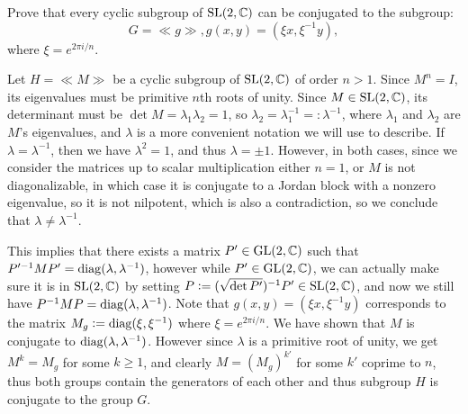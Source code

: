 \documentclass[11pt, a4paper]{article}
\begin{document}
\begin{exercise}
  \label{ex:subgroups-of-sl}
  Prove that every cyclic subgroup of $\mathrm{SL}(2,\mathbb{C})$
  can be conjugated to the subgroup:
  \[
    G = \ll g \gg,
    g(x,y) = (\xi x, \xi^{-1} y),
  \]
  where $\xi = e^{2\pi i/n}$.
\end{exercise}
\begin{solution}
  Let $H = \ll M \gg$ be a cyclic subgroup of $\mathrm{SL}(2,\mathbb{C})$ of order $n > 1$.
  Since $M^n = I$, its eigenvalues must be primitive $n$th roots of unity.
  Since $M \in \mathrm{SL}(2,\mathbb{C})$, its determinant must be
  $\det M = \lambda_1 \lambda_2 = 1$,
  so $\lambda_2 = \lambda_1^{-1} =: \lambda^{-1}$,
  where $\lambda_1$ and $\lambda_2$ are $M$'s eigenvalues,
  and $\lambda$ is a more convenient notation we will use to describe.
  If $\lambda = \lambda^{-1}$, then we have $\lambda^2 = 1$,
  and thus $\lambda = \pm 1$.
  However, in both cases, since we consider the matrices up to scalar
  multiplication either $n = 1$, or $M$ is not diagonalizable,
  in which case it is conjugate to a Jordan block with a nonzero
  eigenvalue, so it is not nilpotent, which is also a contradiction,
  so we conclude that $\lambda \neq \lambda^{-1}$.

  This implies that there exists a matrix $P' \in \mathrm{GL}(2,\mathbb{C})$
  such that $P'^{-1} M P' = \operatorname{diag}(\lambda,\lambda^{-1})$,
  however while $P' \in \mathrm{GL}(2,\mathbb{C})$,
  we can actually make sure it is in $\mathrm{SL}(2,\mathbb{C})$
  by setting $P := (\sqrt{\det P'})^{-1} P' \in \mathrm{SL}(2,\mathbb{C})$,
  and now we still have $P^{-1} M P = \operatorname{diag}(\lambda,\lambda^{-1})$.
  Note that $g(x,y) = (\xi x, \xi^{-1} y)$ corresponds
  to the matrix $M_g := \operatorname{diag}(\xi,\xi^{-1})$ where $\xi = e^{2\pi i/n}$.
  We have shown that $M$ is conjugate to $\operatorname{diag}(\lambda,\lambda^{-1})$.
  However since $\lambda$ is a primitive root of unity,
  we get $M^k = M_g$ for some $k \geq 1$,
  and clearly $M = (M_g)^{k'}$ for some $k'$ coprime to $n$,
  thus both groups contain the generators of each other and thus
  subgroup $H$ is conjugate to the group $G$.
\end{solution}
\end{document}
